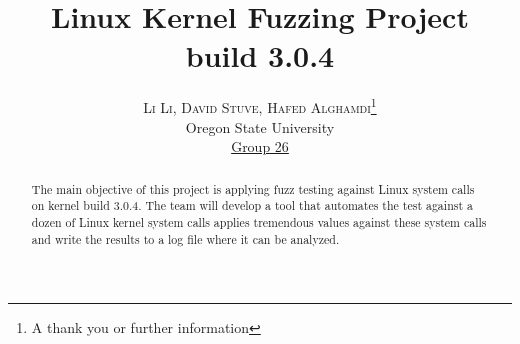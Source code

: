 \documentclass[twoside]{article}
\title{\vspace{-15mm}\fontsize{24pt}{10pt}\selectfont\textbf{Linux Kernel Fuzzing Project}
\fontsize{15pt}{6pt}\selectfont\textbf {
\\ build 3.0.4}
} %
\author{
\large
\textsc{Li Li, David Stuve, Hafed Alghamdi}\thanks{A thank you or further information}\\[2mm] %
\normalsize Oregon State University \\ %
\normalsize \href{mailto:alghamha@onid.oregonstate.edu, stuved@onid.oregonstate.edu, lil4@onid.oregonstate.edu}{Group 26} %
\vspace{-5mm}
}
\date{}
\begin{document}
\maketitle %

\thispagestyle{fancy} %


\begin{abstract}

The main objective of this project is applying fuzz testing against Linux system calls on kernel build 3.0.4. The team will develop a tool that automates the test against a dozen of Linux kernel system calls applies tremendous values against these system calls and write the results to a log file where it can be analyzed.



\end{abstract}

\end{document}
